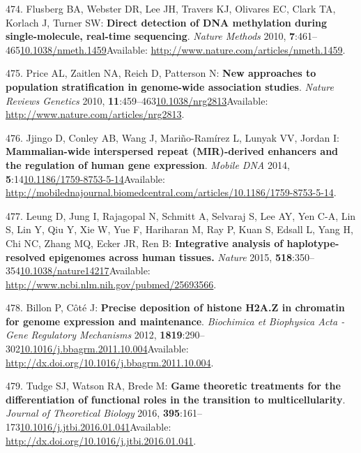 \documentclass[
]{book}
\begin{document}
\leavevmode\hypertarget{ref-Flusberg2010}{}%
474. Flusberg BA, Webster DR, Lee JH, Travers KJ, Olivares EC, Clark TA, Korlach J, Turner SW: \textbf{Direct detection of DNA methylation during single-molecule, real-time sequencing}. \emph{Nature Methods} 2010, \textbf{7}:461--465\href{https://doi.org/10.1038/nmeth.1459}{10.1038/nmeth.1459}Available: \url{http://www.nature.com/articles/nmeth.1459}.

\leavevmode\hypertarget{ref-Price2010}{}%
475. Price AL, Zaitlen NA, Reich D, Patterson N: \textbf{New approaches to population stratification in genome-wide association studies}. \emph{Nature Reviews Genetics} 2010, \textbf{11}:459--463\href{https://doi.org/10.1038/nrg2813}{10.1038/nrg2813}Available: \url{http://www.nature.com/articles/nrg2813}.

\leavevmode\hypertarget{ref-Jjingo2014}{}%
476. Jjingo D, Conley AB, Wang J, Mariño-Ramírez L, Lunyak VV, Jordan I: \textbf{Mammalian-wide interspersed repeat (MIR)-derived enhancers and the regulation of human gene expression}. \emph{Mobile DNA} 2014, \textbf{5}:14\href{https://doi.org/10.1186/1759-8753-5-14}{10.1186/1759-8753-5-14}Available: \url{http://mobilednajournal.biomedcentral.com/articles/10.1186/1759-8753-5-14}.

\leavevmode\hypertarget{ref-Leung2015}{}%
477. Leung D, Jung I, Rajagopal N, Schmitt A, Selvaraj S, Lee AY, Yen C-A, Lin S, Lin Y, Qiu Y, Xie W, Yue F, Hariharan M, Ray P, Kuan S, Edsall L, Yang H, Chi NC, Zhang MQ, Ecker JR, Ren B: \textbf{Integrative analysis of haplotype-resolved epigenomes across human tissues.} \emph{Nature} 2015, \textbf{518}:350--354\href{https://doi.org/10.1038/nature14217}{10.1038/nature14217}Available: \url{http://www.ncbi.nlm.nih.gov/pubmed/25693566}.

\leavevmode\hypertarget{ref-Billon2012}{}%
478. Billon P, Côté J: \textbf{Precise deposition of histone H2A.Z in chromatin for genome expression and maintenance}. \emph{Biochimica et Biophysica Acta - Gene Regulatory Mechanisms} 2012, \textbf{1819}:290--302\href{https://doi.org/10.1016/j.bbagrm.2011.10.004}{10.1016/j.bbagrm.2011.10.004}Available: \url{http://dx.doi.org/10.1016/j.bbagrm.2011.10.004}.

\leavevmode\hypertarget{ref-Tudge2016}{}%
479. Tudge SJ, Watson RA, Brede M: \textbf{Game theoretic treatments for the differentiation of functional roles in the transition to multicellularity}. \emph{Journal of Theoretical Biology} 2016, \textbf{395}:161--173\href{https://doi.org/10.1016/j.jtbi.2016.01.041}{10.1016/j.jtbi.2016.01.041}Available: \url{http://dx.doi.org/10.1016/j.jtbi.2016.01.041}.
\end{document}
